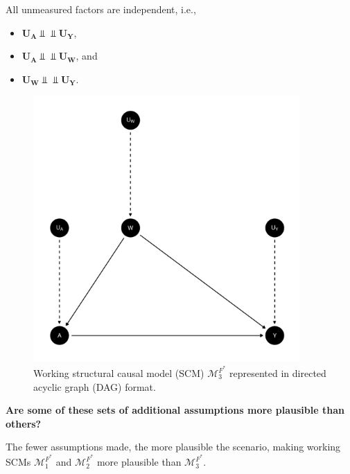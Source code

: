 \documentclass{article}\usepackage[]{graphicx}\usepackage[]{xcolor}
\newenvironment{knitrout}{}{} %
\begin{document}
\begin{enumerate}[label=\textbf{\arabic*.}]
\begin{enumerate}[label=\textbf{(\alph*)}]
\begin{itemize}
  All unmeasured factors are independent, i.e., 
  
  \begin{itemize} 
  
    \item $\bm{U_A} \Perp \!\!\! \Perp \bm{U_Y}$,
    
    \item $\bm{U_A} \Perp \!\!\! \Perp \bm{U_W}$, and
    
    \item $\bm{U_W} \Perp \!\!\! \Perp \bm{U_Y}$.
    
  \end{itemize}
  
\begin{figure}
  \caption{Working structural causal model (SCM) $\mathcal{M}^{F^*}_3$ represented in directed acyclic graph (DAG) format.}
  \centering
    
\begin{knitrout}
\color{fgcolor}
\includegraphics[width=4in]{figure/unnamed-chunk-5-1} 

\end{knitrout}

\end{figure}

\end{itemize}

\pagebreak
 
\textbf{Are some of these sets of additional assumptions more plausible than others?}

The fewer assumptions made, the more plausible the scenario, making working SCMs $\mathcal{M}^{F^*}_1$ and $\mathcal{M}^{F^*}_2$ more plausible than $\mathcal{M}^{F^*}_3$. 


\end{enumerate}
\end{enumerate}
\end{document}
